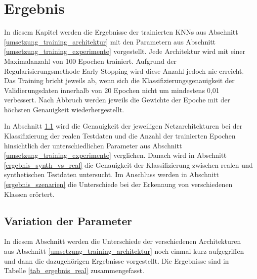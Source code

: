 

\chapter{Ergebnis}
\label{ergebnis}

In diesem Kapitel werden die Ergebnisse der trainierten \acp{KNN} aus Abschnitt \ref{umsetzung_training_architektur} mit den Parametern aus Abschnitt \ref{umsetzung_training_experimente} vorgestellt. Jede Architektur wird mit einer Maximalanzahl von 100 Epochen trainiert. Aufgrund der Regularisierungsmethode Early Stopping wird diese Anzahl jedoch nie erreicht. Das Training bricht jeweils ab, wenn sich die Klassifizierungsgenauigkeit der Validierungsdaten innerhalb von 20 Epochen nicht um mindestens 0,01 verbessert. Nach Abbruch werden jeweils die Gewichte der Epoche mit der höchsten Genauigkeit wiederhergestellt. 

In Abschnitt \ref{ergebnis_parameter} wird die Genauigkeit der jeweiligen Netzarchitekturen bei der Klassifizierung der realen Testdaten und die Anzahl der trainierten Epochen hinsichtlich der unterschiedlichen Parameter aus Abschnitt \ref{umsetzung_training_experimente} verglichen. Danach wird in Abschnitt \ref{ergebnis_synth_vs_real} die Genauigkeit der Klassifizierung zwischen realen und synthetischen Testdaten untersucht. Im Anschluss werden in Abschnitt \ref{ergebnis_szenarien} die Unterschiede bei der Erkennung von verschiedenen Klassen erörtert.


\section{Variation der Parameter}
\label{ergebnis_parameter}

In diesem Abschnitt werden die Unterschiede der verschiedenen Architekturen aus Abschnitt \ref{umsetzung_training_architektur} noch einmal kurz aufgegriffen und dann die dazugehörigen Ergebnisse vorgestellt. Die Ergebnisse sind in Tabelle \ref{tab_ergebnis_real} zusammengefasst.

